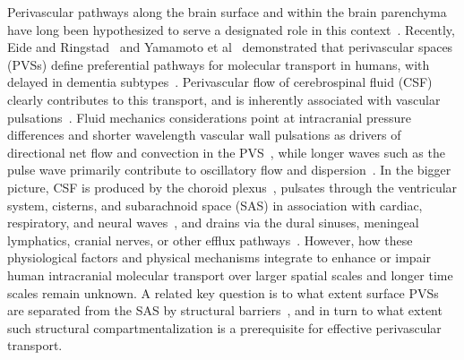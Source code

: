 \documentclass[fleqn,10pt]{wlscirep}
\providecommand{\DIFadd}[1]{{\protect\color{blue}\uwave{#1}}} %
\providecommand{\DIFaddbegin}{} %
\providecommand{\DIFaddend}{} %
\begin{document}
Perivascular pathways along the brain surface and within the brain
parenchyma have long been hypothesized to serve a designated role in
this context~\cite{rennels1985evidence, zhang1990interrelationships,
  ichimura1991distribution, carare2008solutes, iliff2012paravascular,
  foley2012realtime, hannocks2018molecular, van2024caa}. Recently, Eide and
Ringstad~\cite{eide2024functional} and Yamamoto et
al~\cite{yamamoto2024perivascular} demonstrated that perivascular
spaces (PVSs) define preferential pathways for molecular transport in
humans, with delayed  \DIFaddbegin \DIFadd{appearance of tracer }\DIFaddend in dementia
subtypes~\cite{eide2024functional}. Perivascular flow of cerebrospinal
fluid (CSF) clearly contributes to this transport, and is inherently
associated with vascular pulsations~\cite{hadaczek2006perivascular,
  iliff2013cerebral, bedussi2018paravascular, mestre2018flow,
  boster2023artificial, hirschler2024region}. Fluid mechanics
considerations point at intracranial pressure differences and shorter
wavelength vascular wall pulsations as drivers of directional net flow
and convection in the PVS~\cite{bilston2003arterial, rey2018pulsatile,
  daversin2020mechanisms, kedarasetti2020functional,
  gjerde2023directional, nozaleda2024arterial}, while longer waves
such as the pulse wave primarily contribute to oscillatory flow and
dispersion~\cite{asgari2016glymphatic, sharp2019dispersion, thomas2019fluid,
  kedarasetti2020arterial, troyetsky2021dispersion, 
  martinac2021phase}. In the bigger picture, CSF is produced by the
choroid plexus~\cite{damkier2013cerebrospinal,
  steffensen2018cotransporter, liu2020direct}, pulsates through the
ventricular system, cisterns, and subarachnoid space (SAS) in
association with cardiac, respiratory, and neural
waves~\cite{greitz1993pulsatile, wagshul2011pulsating,
  sweetman2011cerebrospinal, fultz2019coupled, vinje2019respiratory,
  eide2021direction, causemann2022human, williams2023neural,
  zimmermann2023total}, and drains via the dural sinuses, meningeal
lymphatics, cranial nerves, or other efflux
pathways~\cite{proulx2021cerebrospinal}. However, how these
physiological factors and physical mechanisms integrate to enhance or
impair human intracranial molecular transport over larger spatial
scales and longer time scales remain unknown. A related key question
is to what extent surface PVSs are separated from the SAS by
structural barriers~\cite{zhang1990interrelationships,
  weller2005microscopic, bedussi2017paravascular,
  pizzo2018intrathecal, mestre2022periarteriolar,
  mollgard2023mesothelium, smets2024perivascular, eide2024functional},
and in turn to what extent such structural compartmentalization is a
prerequisite for effective perivascular transport.
\end{document}
